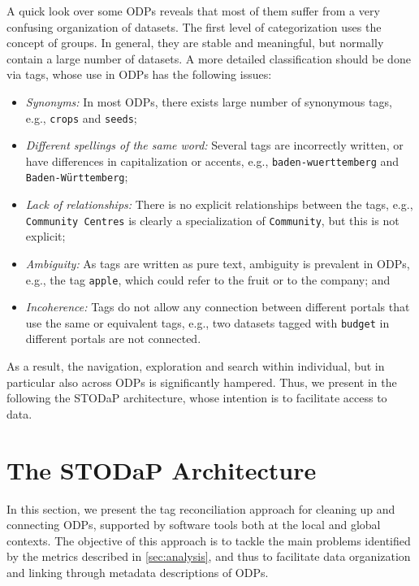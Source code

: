 A quick look over some ODPs reveals that most of them suffer from a very confusing organization of datasets. 
The first level of categorization uses the concept of groups.
In general, they are stable and meaningful, but normally contain a large number of datasets.
A more detailed classification should be done via tags, whose use in ODPs has the following issues:

\begin{itemize}
	\item \emph{Synonyms:} In most ODPs, there exists large number of synonymous tags, e.g., \texttt{crops} and \texttt{seeds};
	\item \emph{Different spellings of the same word:} Several tags are incorrectly written, or have differences in capitalization or accents, e.g., \texttt{baden-wuerttemberg} and \texttt{Baden-W\"{u}rttemberg};
	\item \emph{Lack of relationships:} There is no explicit relationships between the tags, e.g., \texttt{Community Centres} is clearly a specialization of \texttt{Community}, but this is not explicit;
	\item \emph{Ambiguity:} As tags are written as pure text, ambiguity is prevalent in ODPs, e.g., the tag \texttt{apple}, which could refer to the fruit or to the company; and
	\item \emph{Incoherence:} Tags do not allow any connection between different portals that use the same or equivalent tags, e.g., two datasets tagged with \texttt{budget} in different portals are not connected.
\end{itemize}

As a result, the navigation, exploration and search within individual, but in particular also across ODPs is significantly hampered.
Thus, we present in the following the STODaP architecture, whose intention is to facilitate access to data.


\section{The STODaP Architecture}
\label{sec:stodap_architecture}

In this section, we present the tag reconciliation approach for cleaning up and connecting ODPs, supported by software tools both at the local and global contexts.
The objective of this approach is to tackle the main problems identified by the metrics described in \autoref{sec:analysis}, and thus to facilitate data organization and linking through metadata descriptions of ODPs.

